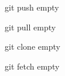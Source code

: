 \begin{frame}[fragile]{git push}
    empty
\end{frame}

\begin{frame}[fragile]{git pull}
    empty
\end{frame}

\begin{frame}[fragile]{git clone}
    empty
\end{frame}

\begin{frame}[fragile]{git fetch}
    empty
\end{frame}
